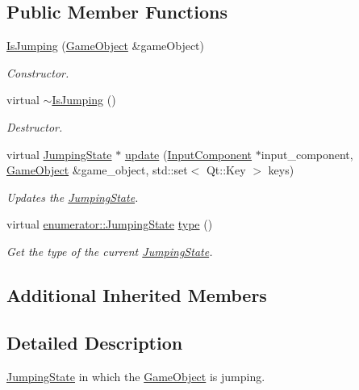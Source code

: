 \subsection*{Public Member Functions}
\begin{DoxyCompactItemize}
\item 
\hyperlink{classIsJumping_a56fda19df58e162d7cef0db368938a80}{Is\-Jumping} (\hyperlink{classGameObject}{Game\-Object} \&game\-Object)
\begin{DoxyCompactList}\small\item\em Constructor. \end{DoxyCompactList}\item 
\hypertarget{classIsJumping_a6c3eed9fd4ae73c64fee32eaf0c102a0}{virtual \hyperlink{classIsJumping_a6c3eed9fd4ae73c64fee32eaf0c102a0}{$\sim$\-Is\-Jumping} ()}\label{classIsJumping_a6c3eed9fd4ae73c64fee32eaf0c102a0}

\begin{DoxyCompactList}\small\item\em Destructor. \end{DoxyCompactList}\item 
virtual \hyperlink{classJumpingState}{Jumping\-State} $\ast$ \hyperlink{classIsJumping_a3b90719ea42ff820c3e9b26ed7033c4c}{update} (\hyperlink{classInputComponent}{Input\-Component} $\ast$input\-\_\-component, \hyperlink{classGameObject}{Game\-Object} \&game\-\_\-object, std\-::set$<$ Qt\-::\-Key $>$ keys)
\begin{DoxyCompactList}\small\item\em Updates the \hyperlink{classJumpingState}{Jumping\-State}. \end{DoxyCompactList}\item 
virtual \hyperlink{namespaceenumerator_a2f1fb1ef7c57e4549f424d454c1e2179}{enumerator\-::\-Jumping\-State} \hyperlink{classIsJumping_a7cd0858e202392069181097c782710de}{type} ()
\begin{DoxyCompactList}\small\item\em Get the type of the current \hyperlink{classJumpingState}{Jumping\-State}. \end{DoxyCompactList}\end{DoxyCompactItemize}
\subsection*{Additional Inherited Members}


\subsection{Detailed Description}
\hyperlink{classJumpingState}{Jumping\-State} in which the \hyperlink{classGameObject}{Game\-Object} is jumping. 

